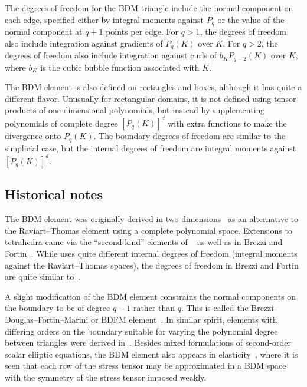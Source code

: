 The degrees of freedom for the BDM triangle include the normal component on each
edge, specified either by integral moments against $P_q$ or the value
of the normal component at
\( q + 1 \) points per edge.
For \( q > 1 \), the degrees of freedom also include integration
against gradients of $P_q(K)$ over $K$.  For \( q > 2 \), the degrees
of freedom also include integration against curls of $b_K P_{q-2}(K)$
over $K$, where \( b_K \) is the cubic bubble function associated with
\( K \).


The BDM element is also defined on rectangles and boxes, although it
has quite a different flavor. Unusually for rectangular domains, it is
not defined using tensor products of one-dimensional polynomials, but
instead by supplementing polynomials of complete degree \( [P_q(K)]^d
\) with extra functions to make the divergence onto \( P_q(K) \).  The
boundary degrees of freedom are similar to the simplicial case, but
the internal degrees of freedom are integral moments against \(
[P_q(K)]^d \).

\subsection{Historical notes}

The BDM element was originally derived in two
dimensions~\cite{BrezziDouglasEtAl1985} as an alternative to the
Raviart--Thomas element using a complete polynomial space. Extensions
to tetrahedra came via the ``second-kind'' elements of
\nedelec{}~\cite{Nedelec1986} as well as in Brezzi and
Fortin~\cite{BrezziFortin1991}. While \nedelec{} uses quite different
internal degrees of freedom (integral moments against the
Raviart--Thomas spaces), the degrees of freedom in Brezzi and Fortin
are quite similar to~\cite{BrezziDouglasEtAl1985}.

A slight modification of the BDM element constrains the normal
components on the boundary to be of degree \( q - 1 \) rather than \(
q \). This is called the Brezzi--Douglas--Fortin--Marini or BDFM
element~\cite{BrezziFortin1991}. In similar spirit, elements with
differing orders on the boundary suitable for varying the polynomial
degree between triangles were derived
in~\cite{BrezziDouglasEtAl1985a}.  Besides mixed formulations of
second-order scalar elliptic equations, the BDM element also appears
in elasticity~\cite{ArnoldFalkEtAl2007}, where it is seen that each
row of the stress tensor may be approximated in a BDM space with the
symmetry of the stress tensor imposed weakly.

